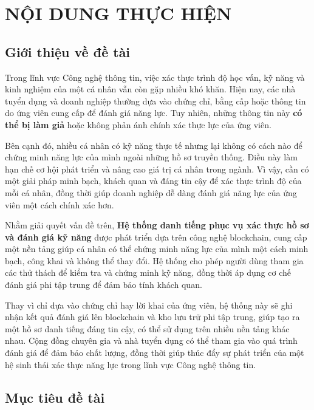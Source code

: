 \documentclass{article}[14pt]
\begin{document}
    \section{NỘI DUNG THỰC HIỆN}
    {
        
    \subsection{Giới thiệu về đề tài}
    
    Trong lĩnh vực Công nghệ thông tin, việc xác thực trình độ học vấn, kỹ năng và kinh nghiệm của một cá nhân vẫn còn gặp nhiều khó khăn. 
    Hiện nay, các nhà tuyển dụng và doanh nghiệp thường dựa vào chứng chỉ, bằng cấp hoặc thông tin do ứng viên cung cấp để đánh giá năng lực. 
    Tuy nhiên, những thông tin này \textbf{có thể bị làm giả} hoặc không phản ánh chính xác thực lực của ứng viên.

    Bên cạnh đó, nhiều cá nhân có kỹ năng thực tế nhưng lại không có cách nào để chứng minh năng lực của mình ngoài những hồ sơ truyền thống. 
    Điều này làm hạn chế cơ hội phát triển và nâng cao giá trị cá nhân trong ngành. 
    Vì vậy, cần có một giải pháp minh bạch, khách quan và đáng tin cậy để xác thực trình độ của mỗi cá nhân, 
    đồng thời giúp doanh nghiệp dễ dàng đánh giá năng lực của ứng viên một cách chính xác hơn.

    Nhằm giải quyết vấn đề trên, \textbf{Hệ thống danh tiếng phục vụ xác thực hồ sơ và đánh giá kỹ năng} được phát triển dựa trên công nghệ blockchain, 
    cung cấp một nền tảng giúp cá nhân có thể chứng minh năng lực của mình một cách minh bạch, công khai và không thể thay đổi. 
    Hệ thống cho phép người dùng tham gia các thử thách để kiểm tra và chứng minh kỹ năng, đồng thời áp dụng cơ chế đánh giá phi tập trung để đảm bảo tính khách quan.

    Thay vì chỉ dựa vào chứng chỉ hay lời khai của ứng viên, hệ thống này sẽ ghi nhận kết quả đánh giá lên blockchain và kho lưu trữ phi tập trung, 
    giúp tạo ra một hồ sơ danh tiếng đáng tin cậy, có thể sử dụng trên nhiều nền tảng khác nhau. 
    Cộng đồng chuyên gia và nhà tuyển dụng có thể tham gia vào quá trình đánh giá để đảm bảo chất lượng, 
    đồng thời giúp thúc đẩy sự phát triển của một hệ sinh thái xác thực năng lực trong lĩnh vực Công nghệ thông tin.
    
    \subsection{Mục tiêu đề tài}

}
\end{document}
